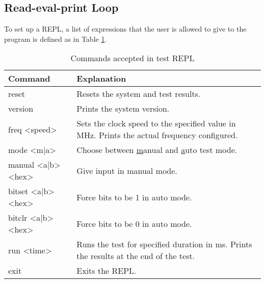 \subsection{Read-eval-print Loop}

To set up a REPL, a list of expressions that the user is allowed to give to the program is defined as in Table \ref{REPL Commands}.

\begin{table}[H]
  \centering
  \begin{tabular}{|>{\ttfamily}p{11em}|p{\dimexpr\textwidth-18em}|}
    \hline
    \textrm{Command}   & Explanation \\
    \hline
    reset              & Resets the system and test results. \\
    version            & Prints the system version. \\
    freq <speed>       & Sets the clock speed to the specified value in MHz. Prints the actual frequency configured. \\
    mode <m|a>         & Choose between \underline{m}anual and \underline{a}uto test mode. \\
    manual <a|b> <hex> & Give input in manual mode. \\
    bitset <a|b> <hex> & Force bits to be 1 in auto mode. \\
    bitclr <a|b> <hex> & Force bits to be 0 in auto mode. \\
    run <time>         & Runs the test for specified duration in ms. Prints the results at the end of the test. \\
    exit               & Exits the REPL. \\
    \hline
  \end{tabular}
  \caption{Commands accepted in test REPL}
  \label{REPL Commands}
\end{table}
